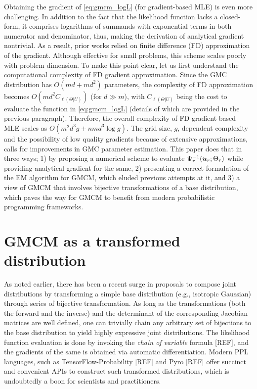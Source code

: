 \documentclass{article}
\begin{document}
 

Obtaining the gradient of \eqref{eq:gmcm_logL} (for gradient-based MLE) is even more challenging. In addition to the fact that the likelihood function lacks a closed-form, it comprises logarithms of summands with exponential terms in both numerator and denominator, thus, making the derivation of analytical gradient nontrivial. As a result, prior works \citep{Tewari2011, Bilgrau2016} relied on finite difference (FD) approximation of the gradient. Although effective for small problems, this scheme scales poorly with problem dimension. To make this point clear, let us first understand the computational complexity of FD gradient approximation. Since the GMC distribution has $O(md+md^2)$ parameters, the complexity of FD approximation becomes $O(md^2C_{\ell(\Theta|U)})$ (for $d\gg m$), with $C_{\ell(\Theta|U)}$ being the cost to evaluate the function in  \eqref{eq:gmcm_logL} (details of which are provided in the previous paragraph).  Therefore, the overall complexity of FD gradient based MLE scales as $O(m^2d^3g+nmd^3\log{g})$. The grid size, $g$, dependent complexity and the possibility of low quality gradients because of extensive approximations, calls for improvements in GMC parameter estimation. This paper does that in three ways; 1) by proposing a numerical scheme to evaluate $\Psi_r^{-1}(\boldsymbol{u}_r;\Theta_r)$ while providing analytical gradient for the same, 2) presenting a correct formulation of the EM algorithm for GMCM, which eluded previous attempts at it, and 3) a view of GMCM that involves bijective transformations of a base distribution, which paves the way for GMCM to benefit from modern probabilistic programming frameworks.

\section{GMCM as a transformed distribution}

As noted earlier, there has been a recent surge in proposals to compose joint distributions by transforming a simple base distribution (e.g., isotropic Gaussian) through series of bijective transformation. As long as the transformations (both the forward and the inverse) and the determinant of the corresponding Jacobian matrices are well defined, one can trivially chain any arbitrary set of bijections to the base distribution to yield highly expressive joint distributions. The likelihood function evaluation is done by invoking the \emph{chain of variable} formula [REF], and the gradients of the same is  obtained via automatic differentiation. Modern PPL languages, such as TensorFlow-Probability [REF] and Pyro [REF] offer succinct and convenient APIs to construct such transformed distributions, which is undoubtedly a boon for scientists and practitioners.
\end{document}
